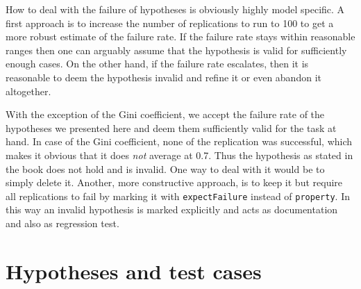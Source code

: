 %
%		
%	
%
%
%

How to deal with the failure of hypotheses is obviously highly model specific. A first approach is to increase the number of replications to run to 100 to get a more robust estimate of the failure rate. If the failure rate stays within reasonable ranges then one can arguably assume that the hypothesis is valid for sufficiently enough cases. On the other hand, if the failure rate escalates, then it is reasonable to deem the hypothesis invalid and refine it or even abandon it altogether.

With the exception of the Gini coefficient, we accept the failure rate of the hypotheses we presented here and deem them sufficiently valid for the task at hand. In case of the Gini coefficient, none of the replication was successful, which makes it obvious that it does \textit{not} average at 0.7. Thus the hypothesis as stated in the book does not hold and is invalid. One way to deal with it would be to simply delete it. Another, more constructive approach, is to keep it but require all replications to fail by marking it with \texttt{expectFailure} instead of \texttt{property}. In this way an invalid hypothesis is marked explicitly and acts as documentation and also as regression test.

\section{Hypotheses and test cases}
\label{sec:hypotheses_testcases}

